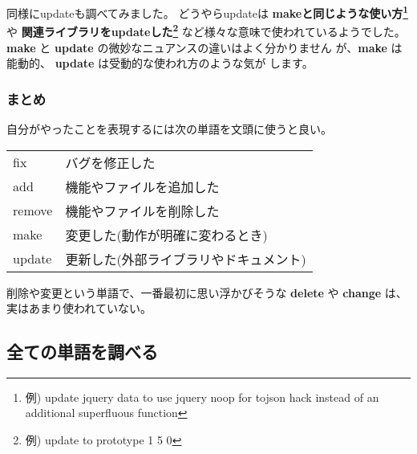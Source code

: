 \documentclass{jarticle}
\begin{document}
   同様にupdateも調べてみました。
   どうやらupdateは
   {\bf makeと同じような使い方{\footnote{例) update jquery data to use jquery noop for tojson hack instead of an additional superfluous function}}} や
   {\bf 関連ライブラリをupdateした{\footnote{例) update to prototype 1 5
   0 }}} など様々な意味で使われているようでした。
   {\bf make} と {\bf update} の微妙なニュアンスの違いはよく分かりません
   が、{\bf make} は能動的、 {\bf update} は受動的な使われ方のような気が
   します。

  \subsubsection{まとめ}
  自分がやったことを表現するには次の単語を文頭に使うと良い。
  \begin{table}[htbp]
   \begin{center}
    \begin{tabular}{ll}
     fix & バグを修正した \\
     add & 機能やファイルを追加した \\
     remove & 機能やファイルを削除した \\
     make & 変更した(動作が明確に変わるとき) \\
     update & 更新した(外部ライブラリやドキュメント) \\
    \end{tabular}
   \end{center}
  \end{table}

  削除や変更という単語で、一番最初に思い浮かびそうな {\bf delete} や {\bf change} は、
  実はあまり使われていない。

 \subsection{全ての単語を調べる}
\end{document}
